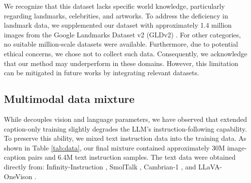 We recognize that this dataset lacks specific world knowledge, particularly regarding landmarks, celebrities, and artworks. To address the deficiency in landmark data, we supplemented our dataset with approximately 1.4 million images from the Google Landmarks Dataset v2 (GLDv2) \cite{googlelandmarksdatasetv2}. For other categories, no suitable million-scale datasets were available. Furthermore, due to potential ethical concerns, we chose not to collect such data. Consequently, we acknowledge that our method may underperform in these domains. However, this limitation can be mitigated in future works by integrating relevant datasets. 

\subsection{Multimodal data mixture}

While \model{} decouples vision and language parameters, we have observed that extended caption-only training slightly degrades the LLM's instruction-following capability. To preserve this ability, we mixed text instruction data into the training data. As shown in Table \ref{tab:data}, our final mixture contained approximately 30M image-caption pairs and 6.4M text instruction samples. The text data were obtained directly from: Infinity-Instruction \cite{infinityinstruct}, SmolTalk \cite{smoltalk}, Cambrian-1 \cite{cambrian1}, and LLaVA-OneVison \cite{llavaov}.